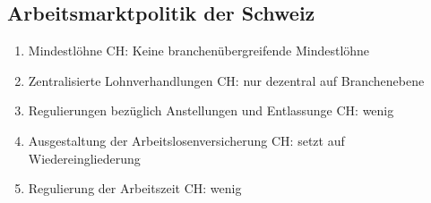 \subsection{Arbeitsmarktpolitik der Schweiz}
\begin{enumerate}
	\item Mindestlöhne
	\subitem CH: Keine branchenübergreifende Mindestlöhne
	\item Zentralisierte Lohnverhandlungen
	\subitem CH: nur dezentral auf Branchenebene
	\item Regulierungen bezüglich Anstellungen und Entlassunge
	\subitem CH: wenig
	\item Ausgestaltung der Arbeitslosenversicherung
	\subitem CH: setzt auf Wiedereingliederung
	\item Regulierung der Arbeitszeit
	\subitem CH: wenig
\end{enumerate}